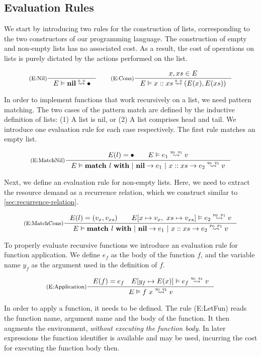\subsection{Evaluation Rules}

We start by introducing two rules for the construction of lists, corresponding to the two constructors of our programming language. The construction of empty and non-empty lists has no associated cost. As a result, the cost of operations on lists is purely dictated by the actions performed on the list. 

\[
   \inference[(E:Nil)]
   {}
   {\evals{E}{\listnil}{\bullet}{0}{0}}
   \qquad
   \inference[(E:Cons)]
   {\contains{E}{x, xs}}
   {\evals{E}{\cons{x}{xs}}{(E(x), E(xs))}{0}{0}}
\]

In order to implement functions that work recursively on a list, we need pattern matching. The two cases of the pattern match are defined by the inductive definition of lists: (1) A list is nil, or (2) A list comprises head and tail. We introduce one evaluation rule for each case respectively. The first rule matches an empty list.

\[
   \inference[(E:MatchNil)]
   {E(l) = \bullet \qquad \evals{E}{e_1}{v}{q_0}{q_1}}
   {\evals{E}{\listmatch{l}{e_1}{e_2}}{v}{q_0}{q_1}}
\]

Next, we define an evaluation rule for non-empty lists. Here, we need to extract the resource demand as a recurrence relation, which we construct similar to \cref{sec:recurrence-relation}.

\[
   \inference[(E:MatchCons)]
   {E(l) = (v_x, v_{xs}) \qquad \evals{E[x \mapsto v_x,~xs \mapsto v_{xs}]}{e_2}{v}{p_0}{p_1}} 
   {\evals{E}{\listmatch{l}{e_1}{e_2}}{v}{p_0}{p_1}}
\]

To properly evaluate recursive functions we introduce an evaluation rule for function application. We define \(e_f\) as the body of the function \(f\), and the variable name \(y_f\) as the argument used in the definition of \(f\). 

\[
   \inference[(E:Application)]
   {E(f) = e_f 
   \quad 
   \evals{E[y_f \mapsto E(x)]}{e_f}{v}{q_0}{q_1}}
   {\evals{E}{f~x}{v}{q_0}{q_1}}
\]

In order to apply a function, it needs to be defined. The rule (E:LetFun) reads the function name, argument name and the body of the function. It then augments the environment, \emph{without executing the function body}. In later expressions the function identifier is available and may be used, incurring the cost for executing the function body then.

